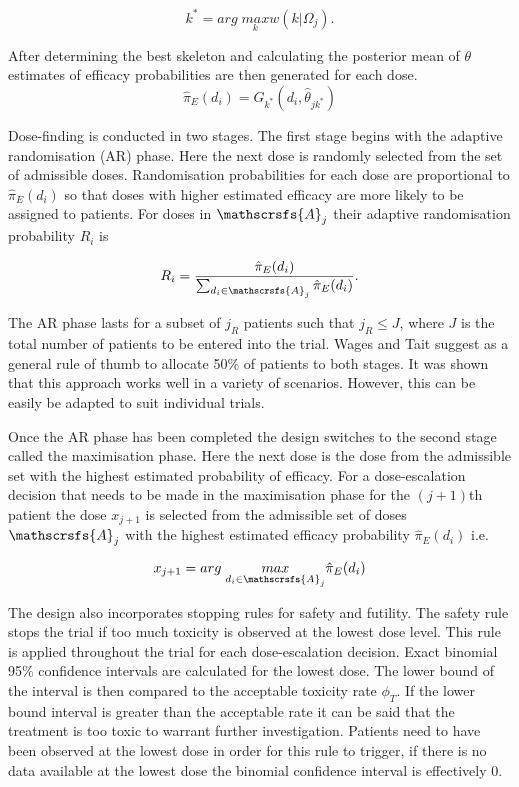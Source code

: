 \begin{equation}
k^* = arg \; \underset{k}{max}w(k|\Omega_j).
\end{equation}

After determining the best skeleton and calculating the posterior mean of $\theta$ estimates of efficacy probabilities are then generated for each dose. 
\begin{equation}
\hat{\pi}_E(d_i) = G_{k^*} (d_i, \hat{\theta}_{jk^*})
\end{equation}

Dose-finding is conducted in two stages. The first stage begins with the adaptive randomisation (AR) phase. Here the next dose is randomly selected from the set of admissible doses. Randomisation probabilities for each dose are proportional to $\hat{\pi}_E(d_i)$ so that doses with higher estimated efficacy are more likely to be assigned to patients. For doses in $\mathscrsfs{A}_j$ their adaptive randomisation probability $R_i$ is 

\begin{equation}
\label{WT:eq_WT-ARprob}
R_i = \frac{\hat{\pi}_E(d_i)}{\sum_{d_i \in \mathscrsfs{A}_j}\hat{\pi}_E(d_i)}. 
\end{equation}

The AR phase lasts for a subset of $j_R$ patients such that $j_R \leq J$, where $J$ is the total number of patients to be entered into the trial. Wages and Tait suggest as a general rule of thumb to allocate 50\% of patients to both stages. It was shown that this approach works well in a variety of scenarios. However, this can be easily be adapted to suit individual trials. 

Once the AR phase has been completed the design switches to the second stage called the maximisation phase. Here the next dose is the dose from the admissible set with the highest estimated probability of efficacy. For a dose-escalation decision that needs to be made in the maximisation phase for the $(j+1)$th patient the dose $x_{j+1}$ is selected from the admissible set of doses $\mathscrsfs{A}_j$ with the highest estimated efficacy probability $\hat{\pi}_E(d_i)$ i.e. 

\begin{equation}
x_{j+1} = arg \; \underset{d_i \in \mathscrsfs{A}_j}{max}\hat{\pi}_E(d_i)
\end{equation}

The design also incorporates stopping rules for safety and futility. The safety rule stops the trial if too much toxicity is observed at the lowest dose level. This rule is applied throughout the trial for each dose-escalation decision. Exact binomial 95\% confidence intervals are calculated for the lowest dose. The lower bound of the interval is then compared to the acceptable toxicity rate $\phi_T$. If the lower bound interval is greater than the acceptable rate it can be said that the treatment is too toxic to warrant further investigation. Patients need to have been observed at the lowest dose in order for this rule to trigger, if there is no data available at the lowest dose the binomial confidence interval is effectively 0. 

